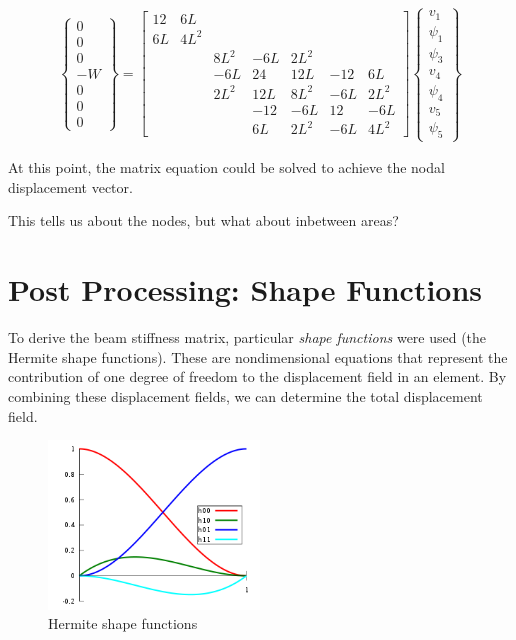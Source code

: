 \documentclass[10pt,letterpaper]{article}
\begin{document}
	\begin{align}
		\begin{Bmatrix}
			0 \\
			0 \\
			0 \\
			-W \\
			0 \\
			0 \\
			0
		\end{Bmatrix} = \begin{bmatrix}
12 & 6L & & & & & \\
6L & 4L^2 & & & & & \\
 & & 8L^2 & -6L & 2L^2 & & \\
 & & -6L & 24 & 12L & -12 & 6L \\
 & & 2L^2 & 12L & 8L^2 & -6L & 2L^2 \\
 & & & -12 & -6L & 12 & -6L \\
 & & & 6L & 2L^2 & -6L & 4L^2 
 		\end{bmatrix} \begin{Bmatrix}
			v_1 \\
			\psi_1 \\
			\psi_3 \\
			v_4 \\
			\psi_4 \\
			v_5 \\
			\psi_5
		\end{Bmatrix}
	\end{align}

	At this point, the matrix equation could be solved to achieve the nodal displacement vector.

	This tells us about the nodes, but what about inbetween areas?

	\section{Post Processing: Shape Functions}

	To derive the beam stiffness matrix, particular \textit{shape functions} were used (the Hermite shape functions). These are nondimensional equations that represent the contribution of one degree of freedom to the displacement field in an element. By combining these displacement fields, we can determine the total displacement field.

	\begin{figure}
		\includegraphics[width=0.5\textwidth]{hermite.png}
		\caption{Hermite shape functions}
	\end{figure}
\end{document}
